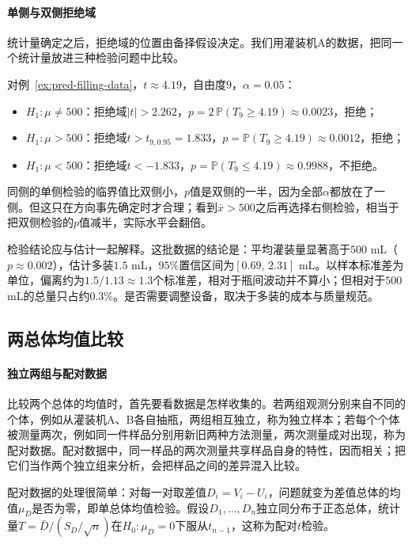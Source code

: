 \paragraph{单侧与双侧拒绝域}

统计量确定之后，拒绝域的位置由备择假设决定。我们用灌装机A的数据，把同一个统计量放进三种检验问题中比较。

\begin{example}[灌装量的三种检验]
\label{ex:pred-filling-three-tests}
对例~\ref{ex:pred-filling-data}，$t\approx4.19$，自由度$9$，$\alpha=0.05$：
\begin{itemize}
  \item $H_1:\mu\neq500$：拒绝域$|t|>2.262$，$p=2\,\mathbb P(T_9\geq4.19)\approx0.0023$，拒绝；
  \item $H_1:\mu>500$：拒绝域$t>t_{9,0.95}=1.833$，$p=\mathbb P(T_9\geq4.19)\approx0.0012$，拒绝；
  \item $H_1:\mu<500$：拒绝域$t<-1.833$，$p=\mathbb P(T_9\leq4.19)\approx0.9988$，不拒绝。
\end{itemize}
同侧的单侧检验的临界值比双侧小，$p$值是双侧的一半，因为全部$\alpha$都放在了一侧。但这只在方向事先确定时才合理；看到$\bar x>500$之后再选择右侧检验，相当于把双侧检验的$p$值减半，实际水平会翻倍。
\end{example}

检验结论应与估计一起解释。这批数据的结论是：平均灌装量显著高于$500$ mL（$p\approx0.002$），估计多装$1.5$ mL，$95\%$置信区间为$[0.69,\,2.31]$ mL。以样本标准差为单位，偏离约为$1.5/1.13\approx1.3$个标准差，相对于瓶间波动并不算小；但相对于$500$ mL的总量只占约$0.3\%$。是否需要调整设备，取决于多装的成本与质量规范。

\subsection{两总体均值比较}

\paragraph{独立两组与配对数据}

比较两个总体的均值时，首先要看数据是怎样收集的。若两组观测分别来自不同的个体，例如从灌装机A、B各自抽瓶，两组相互独立，称为独立样本；若每个个体被测量两次，例如同一件样品分别用新旧两种方法测量，两次测量成对出现，称为配对数据。配对数据中，同一样品的两次测量共享样品自身的特性，因而相关；把它们当作两个独立组来分析，会把样品之间的差异混入比较。

配对数据的处理很简单：对每一对取差值$D_i=V_i-U_i$，问题就变为差值总体的均值$\mu_D$是否为零，即单总体均值检验。假设$D_1,\dots,D_n$独立同分布于正态总体，统计量$T=\bar D/(S_D/\sqrt n)$在$H_0:\mu_D=0$下服从$t_{n-1}$，这称为配对$t$检验。


